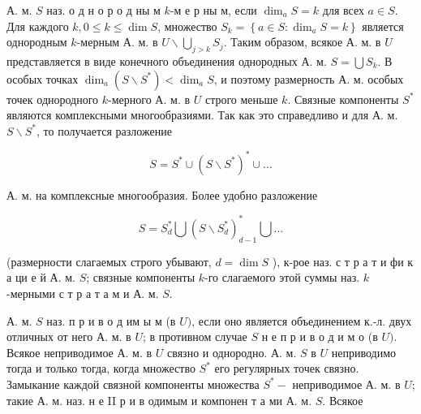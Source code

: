 \documentclass[10pt]{article}
\begin{document}
А. м. $S$ наз. о д н о р о д ны м $k$-м е р ны м, если $\operatorname{dim}_{a} S=k$ для всех $a \in S$. Для каждого $k, 0 \leqslant k \leqslant \operatorname{dim} S$, множество $S_{k}=\left\{a \in S: \operatorname{dim}_{a} S=k\right\}$ является однородным $k$-мерным А. м. в $U \backslash \bigcup_{j>k} S_{j}$. Таким образом, всякое А. м. в $U$ представляется в виде конечного объединения однородных А. м. $S=\bigcup S_{k}$. В особых точках $\operatorname{dim}_{a}\left(S \backslash S^{*}\right)<\operatorname{dim}_{a} S$, и поэтому размерность А. м. особых точек однородного $k$-мерного А. м. в $U$ строго меньше $k$. Связные компоненты $S^{*}$ являются комплексными многообразиями. Так как это справедливо и для А. м. $S \backslash S^{*}$, то получается разложение



\[

S=S^{*} \cup\left(S \backslash S^{*}\right)^{*} \cup \ldots

\]



А. м. на комплексные многообразия. Более удобно разложение



\[

S=S_{d}^{*} \bigcup\left(S \backslash S_{d}^{*}\right)_{d-1}^{*} \bigcup \ldots

\]



(размерности слагаемых строго убывают, $d=\operatorname{dim} S$ ), к-рое наз. с т р а т и фи к а ци е й А. м. $S$; связные компоненты $k$-го слагаемого этой суммы наз. $k$-мерными с т р а т а м и А. м. $S$.



А. м. $S$ наз. п р и в о д им ы м (в $U)$, если оно является объединением к.-л. двух отличных от него А. м. в $U$; в противном случае $S$ н е п р и в о д и м о (в $U)$. Всякое неприводимое А. м. в $U$ связно и однородно. А. м. $S$ в $U$ неприводимо тогда и только тогда, когда множество $S^{*}$ его регулярных точек связно. Замыкание каждой связной компоненты множества $S^{*}-$ неприводимое А. м. в $U$; такие А. м. наз. н е II р и в одимым и компонен т а ми А. м. $S$. Всякое
\end{document}
